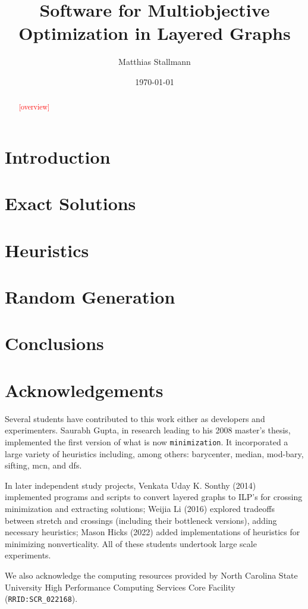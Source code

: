 \documentclass{article}
\author{Matthias Stallmann}
\title{Software for Multiobjective Optimization in Layered Graphs}
\date{\today}
\providecommand{\cmt}[1]{\textsf{\textcolor{red}{[#1]}}}
\begin{document}
\maketitle

\begin{abstract}
  \cmt{overview}
\end{abstract}

\section{Introduction}

\section{Exact Solutions}



\section{Heuristics}



\section{Random Generation}

\section{Conclusions}

\section*{Acknowledgements}

Several students have contributed to this work either as developers and experimenters.
Saurabh Gupta, in research leading to his 2008 master's thesis, implemented the first version of what is now \texttt{minimization}. It incorporated a large variety of heuristics including, among others: barycenter, median, mod-bary, sifting, mcn, and dfs.

In later independent study projects, Venkata Uday K. Sonthy (2014) implemented programs and scripts to convert layered graphs to ILP's for crossing minimization and extracting solutions; Weijia Li (2016) explored tradeoffs between stretch and crossings (including their bottleneck versions), adding necessary heuristics;
Mason Hicks (2022) added implementations of heuristics for minimizing nonverticality. All of these students undertook large scale experiments.

We also acknowledge the computing resources provided by North Carolina State University High Performance Computing Services Core Facility (\texttt{RRID:SCR\_022168}).




\end{document}
